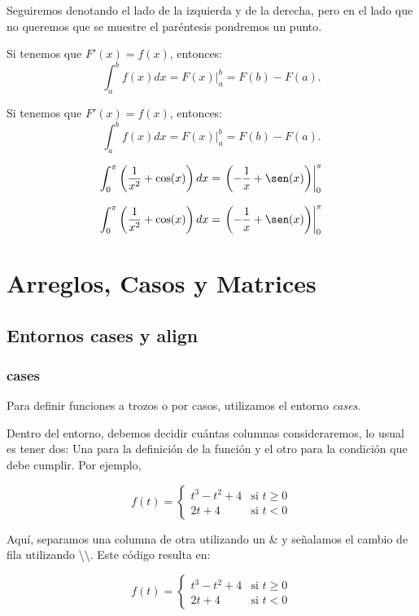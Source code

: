 \documentclass[graybox,envcountchap,sectrefs]{svmono}
\begin{document}
            Seguiremos denotando el lado de la izquierda y de la derecha, pero en el lado que no queremos
            que se muestre el paréntesis pondremos un punto.

            \begin{code}
                Si tenemos que \(F'(x)=f(x)\), entonces:
                \[ \int_a^b f(x)dx = \left. F(x)\right\vert_a^b = F(b)-F(a). \]
            \end{code}
            \begin{compiled}
                Si tenemos que \(F'(x)=f(x)\), entonces:
                \[ \int_a^b f(x)dx = \left. F(x)\right\vert_a^b = F(b)-F(a). \]
            \end{compiled}


            \begin{code}
            \[ \int_0^{\pi} \left(\frac{1}{x^2}+\cos(x)\right)dx 
            = \left. \left( -\frac{1}{x}+\sen(x) \right)\right\vert_0^{\pi} \]
            \end{code}
            \begin{compiled}
                \[ \int_0^{\pi} \left(\frac{1}{x^2}+\cos(x)\right)dx = \left. \left( -\frac{1}{x}+\sen(x) \right)\right\vert_0^{\pi} \]
            \end{compiled}






    \chapter{Arreglos, Casos y Matrices}
\section{Entornos cases y align}
\subsection{cases}
Para definir funciones a trozos o por casos, utilizamos el entorno \emph{cases}.


Dentro del entorno, debemos decidir cuántas columnas consideraremos, lo usual es tener dos:
Una para la definición de la función y el otro para la condición que debe cumplir.
Por ejemplo,
\begin{code}
    \[
        f(t) =    \begin{cases}
                    t^3-t^2+4   & \text{si } t \geq 0 \\
                    2t+4        & \text{si } t < 0
                \end{cases}
    \]
\end{code}
Aquí, separamos una columna de otra utilizando un \& y señalamos el cambio de fila
utilizando \textbackslash\textbackslash. Este código resulta en:
\begin{compiled}
    \[f(t) =    \begin{cases}
                    t^3-t^2+4   & \text{si } t \geq 0 \\
                    2t+4        & \text{si } t < 0
                \end{cases}\]
\end{compiled}
\end{document}
